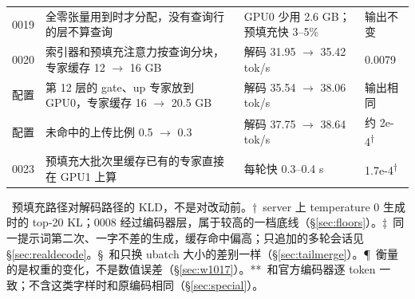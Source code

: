 \documentclass[11pt,a4paper]{article}
\newcommand{\tps}{tok/s}
\begin{document}
\begin{table}[!tp]
\begin{tabularx}{\textwidth}{@{}l X l l@{}}
    0019 & 全零张量用到时才分配，没有查询行的层不算查询 & GPU0 少用 2.6 GB；预填充快 3--5\% & 输出不变 \\
    0020 & 索引器和预填充注意力按查询分块，专家缓存 12 $\to$ 16 GB & 解码 31.95 $\to$ 35.42 \tps{} & 0.0079 \\
    配置 & 第 12 层的 gate、up 专家放到 GPU0，专家缓存 16 $\to$ 20.5 GB & 解码 35.54 $\to$ 38.06 \tps{} & 输出相同 \\
    配置 & 未命中的上传比例 0.5 $\to$ 0.3 & 解码 37.75 $\to$ 38.64 \tps{} & 约 2e-4\textsuperscript{†} \\
    0023 & 预填充大批次里缓存已有的专家直接在 GPU1 上算 & 每轮快 0.3--0.4 s & 1.7e-4\textsuperscript{†} \\
    \bottomrule
  \end{tabularx}
  \par\smallskip\raggedright\footnotesize *\ 预填充路径对解码路径的 KLD，不是对改动前。†\ server 上 temperature 0 生成时的 top-20 KL；0008 经过编码器层，属于较高的一档底线（\S\ref{sec:floors}）。‡\ 同一提示词第二次、一字不差的生成，缓存命中偏高；只追加的多轮会话见 \S\ref{sec:realdecode}。§\ 和只换 ubatch 大小的差别一样（\S\ref{sec:tailmerge}）。¶\ 衡量的是权重的变化，不是数值误差（\S\ref{sec:w1017}）。**\ 和官方编码器逐 token 一致；不含这类字样时和原编码相同（\S\ref{sec:special}）。
\end{table}
\end{document}
